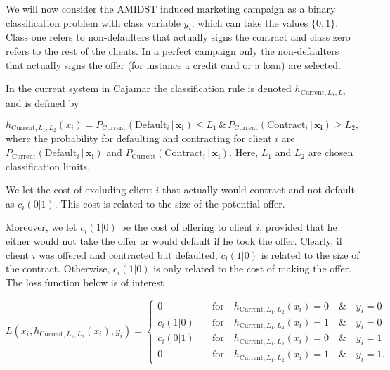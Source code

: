 \documentclass{article}
\theoremstyle{theorem}
\theoremstyle{definition}
\newcommand{\bv}[1]{\bm{#1}}
\begin{document}
{We will now consider the AMIDST induced marketing campaign as a binary classification problem with class variable $y_i$, which can take the values $\{0,1\}$. Class one refers to non-defaulters that actually signs the contract and class zero refers to the rest of the clients.  In a perfect campaign only the non-defaulters that actually signs the offer (for instance a credit card or a loan) are selected.  

In the current system in Cajamar the classification rule is denoted $h_{\mbox{Current},L_1,L_2}$ and is defined by

\begin{equation}
\label{def:empRisk}
h_{\mbox{Current},L_1,L_2}(x_i) = P_{\mbox{Current}}(\mbox{Default}_i \,|\, \bv{x_i}) \leq L_1 \, \& \,P_{\mbox{Current}}(\mbox{Contract}_i \,|\, \bv{x_i}) \geq L_2,
\end{equation}
where the probability for defaulting and contracting for client $i$ are $P_{\mbox{Current}}(\mbox{Default}_i \,|\, \bv{x_i})$ and $P_{\mbox{Current}}(\mbox{Contract}_i \,|\, \bv{x_i})$.  Here, $L_1$ and $L_2$ are chosen classification limits. 

We let the cost of excluding client $i$ that actually would contract and not default as $c_i(0|1)$.  This cost is related to the size of the potential offer.

Moreover, we let $c_i(1|0)$ be the cost of offering to client $i$, provided that he either would not take the offer or would default if he took the offer.  Clearly, if client $i$ was offered and contracted but defaulted, $c_i(1|0)$ is related to the size of the contract.  Otherwise, $c_i(1|0)$ is only related to the cost of making the offer.  The loss function below is of interest

\begin{equation}
\label{def:empRiskBank}
L(x_i, h_{\mbox{Current},L_1,L_2}(x_i) , y_i) = 
\begin{cases}
0     &\quad \mbox{for} \quad h_{\mbox{Current},L_1,L_2}(x_i) = 0 \quad \& \quad y_i = 0\\
c_i(1|0)    &\quad \mbox{for} \quad h_{\mbox{Current},L_1,L_2}(x_i) = 1 \quad \& \quad y_i = 0\\
c_i(0|1)      &\quad \mbox{for} \quad h_{\mbox{Current},L_1,L_2}(x_i) = 0 \quad \& \quad y_i = 1\\
0   &\quad \mbox{for} \quad h_{\mbox{Current},L_1,L_2}(x_i) = 1 \quad \& \quad y_i = 1.
\end{cases}
\end{equation}

}
\end{document}
